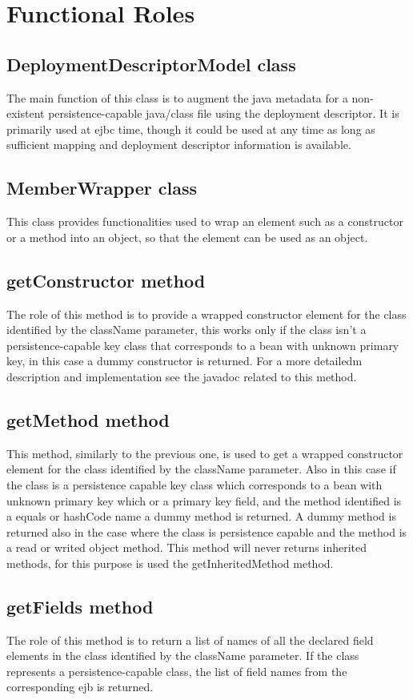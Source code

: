 \section{Functional Roles}
\subsection{DeploymentDescriptorModel class}
The main function of this class is to augment the java metadata for a non-existent persistence-capable java/class file using the deployment descriptor. It is primarily used at ejbc time, though it could be used at any time as long as sufficient mapping and deployment descriptor information is available.

\subsection{MemberWrapper class}
This class provides functionalities used to wrap an element such as a constructor or a method into an object, so that the element can be used as an object.

\subsection{getConstructor method}
The role of this method is to provide a wrapped constructor element for the class identified by the className parameter, this works only if the class isn't a persistence-capable key class that corresponds to a bean with unknown primary key, in this case a dummy constructor is returned. For a more detailedm description and implementation see the javadoc related to this method.

\subsection{getMethod method}
This method, similarly to the previous one, is used to get a wrapped constructor element for the class identified by the className parameter. Also in this case if the class is a persistence capable key class which corresponds to a bean with unknown primary key which or a primary key field, and the method identified is a equals or hashCode name a dummy method is returned. A dummy method is returned also in the case where the class is persistence capable and the method is a read or writed object method. This method will never returns inherited methods, for this purpose is used the getInheritedMethod method.

\subsection{getFields method}
The role of this method is to return a list of names of all the declared field elements in the class identified by the className parameter. If the class represents a persistence-capable class, the list of field names from the corresponding ejb is returned.

